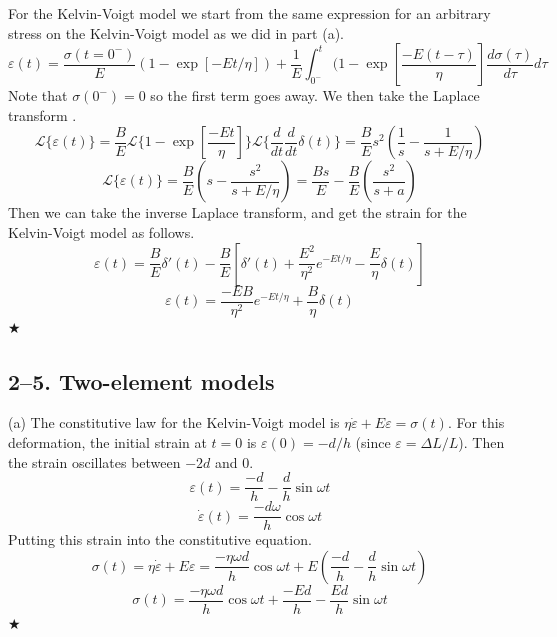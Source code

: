 \documentclass[preprint,12pt,authoryear]{elsarticle}
\begin{document}
For the Kelvin-Voigt model we start from the same expression for an arbitrary stress on the Kelvin-Voigt model as we did in part (a).
\begin{equation}
    \varepsilon(t) = \frac{\sigma(t = 0^-)}{E}(1-\exp[-Et/\eta]) + \frac{1}{E} \int_{0^-}^{t}(1 - \exp[\frac{-E(t-\tau)}{\eta}]\frac{d\sigma(\tau)}{d\tau}d\tau
\end{equation}
Note that $\sigma(0^-)=0$ so the first term goes away. We then take the Laplace transform .
\begin{equation}
    \mathcal{L}\{ \varepsilon(t)\} =  \frac{B}{E}\mathcal{L}\{1 - \exp[\frac{-Et}{\eta}]\} \mathcal{L}\{\frac{d}{dt}\frac{d}{dt}\delta(t)\} = \frac{B}{E}s^2(\frac{1}{s} - \frac{1}{s + E/\eta})
\end{equation}
\begin{equation}
    \mathcal{L}\{ \varepsilon(t)\} = \frac{B}{E}(s - \frac{s^2}{s + E/\eta}) =  \frac{Bs}{E} - \frac{B}{E}(\frac{s^2}{s+a})
\end{equation}
Then we can take the inverse Laplace transform, and get the strain for the Kelvin-Voigt model as follows.
\begin{equation}
    \varepsilon(t) = \frac{B}{E}\delta'(t) - \frac{B}{E} \left[ \delta'(t)+\frac{E^2}{\eta^2}e^{-Et/\eta}- \frac{E}{\eta}\delta(t) \right]
\end{equation}
\begin{equation}
    \varepsilon(t) = \frac{-EB}{\eta^2}e^{-Et/\eta} + \frac{B}{\eta}\delta(t)
\end{equation}
\hspace*{\fill} $\bigstar$
\medskip


\bigskip
\subsection*{2--5. \textbf{Two-element models}}
(a) The constitutive law for the Kelvin-Voigt model is $\eta \dot{\varepsilon} + E\varepsilon = \sigma(t)$. For this deformation, the initial strain at $t=0$ is $\varepsilon(0) = -d/h$ (since $\varepsilon=\Delta L/L$). Then the strain oscillates between $-2d$ and $0$.
\begin{equation}
    \varepsilon(t) = \frac{-d}{h} - \frac{d}{h}\sin{\omega t}
\end{equation}
\begin{equation}
    \dot{\varepsilon}(t) = \frac{-d \omega}{h}\cos{\omega t}
\end{equation}
Putting this strain into the constitutive equation.
\begin{equation}
    \sigma(t) = \eta \dot{\varepsilon} + E\varepsilon = \frac{-\eta \omega d}{h}\cos{\omega t} + E(\frac{-d}{h} - \frac{d}{h}\sin{\omega t})
\end{equation}
\begin{equation}
    \sigma(t) = \frac{-\eta \omega d}{h}\cos{\omega t} + \frac{-Ed}{h} - \frac{Ed}{h}\sin{\omega t}
\end{equation}
\hspace*{\fill} $\bigstar$
\medskip
\end{document}
